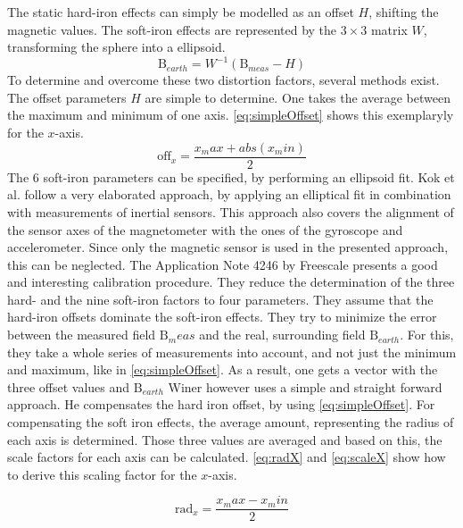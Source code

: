 The static hard-iron effects can simply be modelled as an offset $ H $, shifting the magnetic values. The soft-iron effects are represented by the $ 3\times3 $ matrix $ W $, transforming the sphere into a ellipsoid. 
\begin{equation} \label{eq:hardSoftModel}
\mathrm{B}_{earth} = W^{-1} (\mathrm{B}_{meas} - H)
\end{equation}
To determine and overcome these two distortion factors, several methods exist. The offset parameters $ H $ are simple to determine. One takes the average between the maximum and minimum of one axis. \ref{eq:simpleOffset} shows this exemplaryly for the $ x $-axis. 
\begin{equation} \label{eq:simpleOffset}
\mathrm{off}_{x} = \frac{x_max + abs(x_min)}{2}
\end{equation}
The 6 soft-iron parameters can be specified, by performing an ellipsoid fit. Kok et al. follow a very elaborated approach, by applying an elliptical fit in combination with measurements of inertial sensors. This approach also covers the alignment of the sensor axes of the magnetometer with the ones of the gyroscope and accelerometer. Since only the magnetic sensor is used in the presented approach, this can be neglected. The Application Note 4246 by Freescale \cite{ozyagcilar2012calibrating} presents a good and interesting calibration procedure. They reduce the determination of the three hard- and the nine soft-iron factors to four parameters. They assume that the hard-iron offsets dominate the soft-iron effects. They try to minimize the error between the measured field $ \mathrm{B}_meas $ and the real, surrounding field $ \mathrm{B}_{earth} $. For this, they take a whole series of measurements into account, and not just the minimum and maximum, like in \ref{eq:simpleOffset}. As a result, one gets a vector with the three offset values and $ \mathrm{B}_{earth} $
Winer \cite{Winer} however uses a simple and straight forward approach. He compensates the hard iron offset, by using \ref{eq:simpleOffset}. For compensating the soft iron effects, the average amount, representing the \grqq radius \grqq of each axis is determined. Those three values are averaged and based on this, the scale factors for each axis can be calculated. \ref{eq:radX} and \ref{eq:scaleX} show how to derive this scaling factor for the $ x $-axis.

\begin{equation} \label{eq:radX}
\mathrm{rad}_{x} = \frac{x_max - x_min}{2}
\end{equation}

